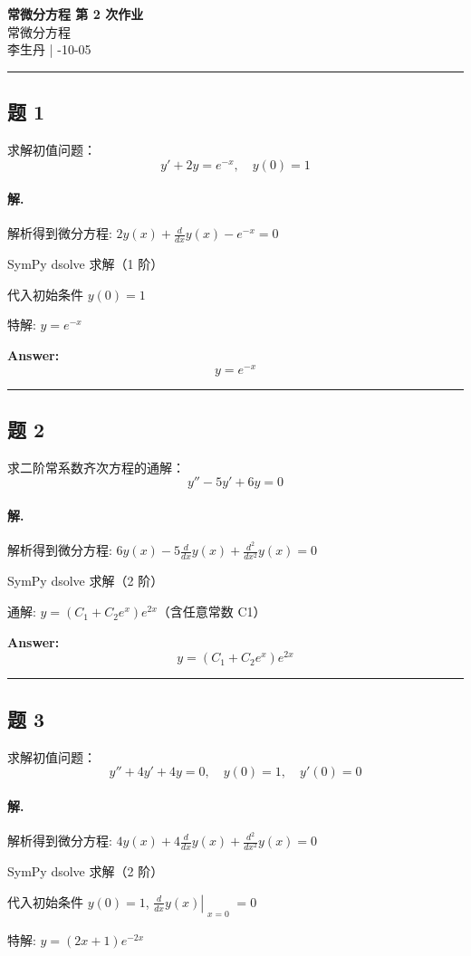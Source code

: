\documentclass[12pt, a4paper]{article}
\newcommand{\problem}[1]{\subsection*{题 #1}}
\newcommand{\solution}{\paragraph{解.}}
\begin{document}
\begin{center}
    {\LARGE\bfseries 常微分方程 第 2 次作业} \\[0.5em]
    {\large 常微分方程} \\[0.3em]
    李生丹 \quad | -10-05
\end{center}

\hrule
\vspace{1em}
\problem{1}

求解初值问题：
$$y' + 2y = e^{-x}, \quad y(0) = 1$$

\solution

解析得到微分方程: $2 y{\left(x \right)} + \frac{d}{d x} y{\left(x \right)} - e^{- x} = 0$

SymPy dsolve 求解（1 阶）

代入初始条件 $y{\left(0 \right)} = 1$

特解: $y = e^{- x}$

\textbf{Answer:}
\[\boxed{y = e^{- x}}\]

\vspace{1em}
\hrule
\vspace{1em}

\problem{2}

求二阶常系数齐次方程的通解：
$$y'' - 5y' + 6y = 0$$

\solution

解析得到微分方程: $6 y{\left(x \right)} - 5 \frac{d}{d x} y{\left(x \right)} + \frac{d^{2}}{d x^{2}} y{\left(x \right)} = 0$

SymPy dsolve 求解（2 阶）

通解: $y = \left(C_{1} + C_{2} e^{x}\right) e^{2 x}$（含任意常数 C1）

\textbf{Answer:}
\[\boxed{y = \left(C_{1} + C_{2} e^{x}\right) e^{2 x}}\]

\vspace{1em}
\hrule
\vspace{1em}

\problem{3}

求解初值问题：
$$y'' + 4y' + 4y = 0, \quad y(0) = 1, \quad y'(0) = 0$$

\solution

解析得到微分方程: $4 y{\left(x \right)} + 4 \frac{d}{d x} y{\left(x \right)} + \frac{d^{2}}{d x^{2}} y{\left(x \right)} = 0$

SymPy dsolve 求解（2 阶）

代入初始条件 $y{\left(0 \right)} = 1$, $\left. \frac{d}{d x} y{\left(x \right)} \right|_{\substack{ x=0 }} = 0$

特解: $y = \left(2 x + 1\right) e^{- 2 x}$
\end{document}

